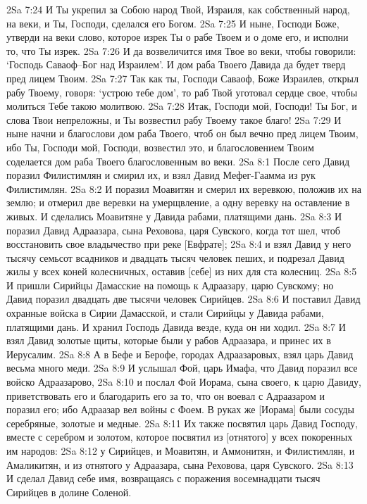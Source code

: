 2Sa 7:24  И Ты укрепил за Собою народ Твой, Израиля, как собственный народ, на веки, и Ты, Господи, сделался его Богом.
2Sa 7:25  И ныне, Господи Боже, утверди на веки слово, которое изрек Ты о рабе Твоем и о доме его, и исполни то, что Ты изрек.
2Sa 7:26  И да возвеличится имя Твое во веки, чтобы говорили: `Господь Саваоф--Бог над Израилем'. И дом раба Твоего Давида да будет тверд пред лицем Твоим.
2Sa 7:27  Так как ты, Господи Саваоф, Боже Израилев, открыл рабу Твоему, говоря: `устрою тебе дом', то раб Твой уготовал сердце свое, чтобы молиться Тебе такою молитвою.
2Sa 7:28  Итак, Господи мой, Господи! Ты Бог, и слова Твои непреложны, и Ты возвестил рабу Твоему такое благо!
2Sa 7:29  И ныне начни и благослови дом раба Твоего, чтоб он был вечно пред лицем Твоим, ибо Ты, Господи мой, Господи, возвестил это, и благословением Твоим соделается дом раба Твоего благословенным во веки.
2Sa 8:1  После сего Давид поразил Филистимлян и смирил их, и взял Давид Мефег-Гаамма из рук Филистимлян.
2Sa 8:2  И поразил Моавитян и смерил их веревкою, положив их на землю; и отмерил две веревки на умерщвление, а одну веревку на оставление в живых. И сделались Моавитяне у Давида рабами, платящими дань.
2Sa 8:3  И поразил Давид Адраазара, сына Реховова, царя Сувского, когда тот шел, чтоб восстановить свое владычество при реке [Евфрате];
2Sa 8:4  и взял Давид у него тысячу семьсот всадников и двадцать тысяч человек пеших, и подрезал Давид жилы у всех коней колесничных, оставив [себе] из них для ста колесниц.
2Sa 8:5  И пришли Сирийцы Дамасские на помощь к Адраазару, царю Сувскому; но Давид поразил двадцать две тысячи человек Сирийцев.
2Sa 8:6  И поставил Давид охранные войска в Сирии Дамасской, и стали Сирийцы у Давида рабами, платящими дань. И хранил Господь Давида везде, куда он ни ходил.
2Sa 8:7  И взял Давид золотые щиты, которые были у рабов Адраазара, и принес их в Иерусалим.
2Sa 8:8  А в Бефе и Берофе, городах Адраазаровых, взял царь Давид весьма много меди.
2Sa 8:9  И услышал Фой, царь Имафа, что Давид поразил все войско Адраазарово,
2Sa 8:10  и послал Фой Иорама, сына своего, к царю Давиду, приветствовать его и благодарить его за то, что он воевал с Адраазаром и поразил его; ибо Адраазар вел войны с Фоем. В руках же [Иорама] были сосуды серебряные, золотые и медные.
2Sa 8:11  Их также посвятил царь Давид Господу, вместе с серебром и золотом, которое посвятил из [отнятого] у всех покоренных им народов:
2Sa 8:12  у Сирийцев, и Моавитян, и Аммонитян, и Филистимлян, и Амаликитян, и из отнятого у Адраазара, сына Реховова, царя Сувского.
2Sa 8:13  И сделал Давид себе имя, возвращаясь с поражения восемнадцати тысяч Сирийцев в долине Соленой.
